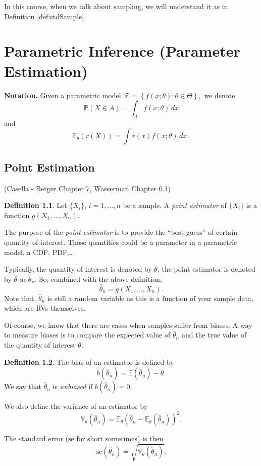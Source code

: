 \documentclass[
  openany]{book}
\theoremstyle{definition}
\newtheorem{definition}{Definition}[chapter]
\theoremstyle{definition}
\theoremstyle{definition}
\theoremstyle{definition}
\theoremstyle{remark}
\begin{document}
In this course, when we talk about sampling, we will understand it as in Definition \ref{def:stdSample}.

\hypertarget{parametric-inference-parameter-estimation}{%
\chapter{Parametric Inference (Parameter Estimation)}\label{parametric-inference-parameter-estimation}}

\textbf{Notation.}
Given a parametric model
\(\mathcal{F} = \left\{ f(x;\theta) : \theta \in \Theta \right\} ,\)
we denote
\[ \mathbb{P}(X \in A ) = \int_A f(x;\theta) \, dx\]
and
\[ \mathbb{E}_\theta ( r(X)) = \int r(x) f(x;\theta) \, dx \,.\]

\hypertarget{point-estimation}{%
\section{Point Estimation}\label{point-estimation}}

(Casella - Berger Chapter 7, Wasserman Chapter 6.1)

\begin{definition}
Let \(\{X_i\}\), \(i = 1, \dots, n\) be a sample.
A \emph{point estimator} of \(\{X_i\}\) is a function
\(g(X_1, \dots, X_n)\).
\end{definition}

The purpose of the \emph{point estimator} is to provide the ``best guess'' of certain quantity of interest.
Those quantities could be a parameter in a parametric model, a CDF, PDF,\ldots{}

Typically, the quantity of interest is denoted by \(\theta\), the point
estimator is denoted by \(\hat \theta\) or \(\hat \theta_n\).
So, combined with the above definition,
\[ \hat \theta_n = g(X_1, \dots, X_n).\]
Note that, \(\hat \theta_n\) is still a random variable as this is a function of
your sample data, which are RVs themselves.

Of course, we know that there are cases when samples suffer from biases.
A way to measure biases is to compare the expected value of \(\hat \theta_n\) and
the true value of the quantity of interest \(\theta\).

\begin{definition}
The bias of an estimator is defined by
\[ b(\hat \theta_n) = \mathbb{E}(\hat \theta_n) - \theta. \]
We say that \(\hat \theta_n\) is \emph{unbiased} if \(b(\hat \theta_n) = 0\).

We also define the variance of an estimator by
\[ \mathbb{V}_\theta(\hat \theta_n) = \mathbb{E}_\theta (\hat \theta_n - \mathbb{E}_\theta (\hat \theta_n))^2 .\]

The standard error (\(\mathrm{se}\) for short sometimes) is then
\[ \mathrm{se}(\hat \theta_n) = \sqrt{\mathbb{V}_\theta (\hat \theta_n)}. \]
\end{definition}
\end{document}
